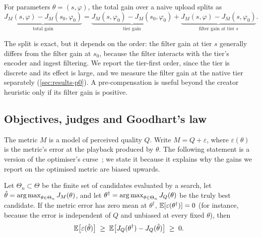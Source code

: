 \begin{definition}
\label{def:decomposition}
For parameters $\theta=(s,\varphi)$, the total gain over a naive upload splits as
\begin{equation}
  \underbrace{J_M(s,\varphi)-J_M(s_0,\varphi_0)}_{\text{total gain}}
  = \underbrace{J_M(s,\varphi_0)-J_M(s_0,\varphi_0)}_{\text{tier gain}}
  + \underbrace{J_M(s,\varphi)-J_M(s,\varphi_0)}_{\text{filter gain at tier } s}.
  \label{eq:decomposition}
\end{equation}
\end{definition}

The split is exact, but it depends on the order: the filter gain at tier $s$ generally differs from
the filter gain at $s_0$, because the filter interacts with the tier's encoder and ingest filtering.
We report the tier-first order, since the tier is discrete and its effect is large, and we measure
the filter gain at the native tier separately (\cref{sec:results-p0}). A pre-compensation is useful
beyond the creator heuristic only if its filter gain is positive.

\subsection{Objectives, judges and Goodhart's law}
\label{sec:goodhart}

The metric $M$ is a model of perceived quality $Q$. Write $M = Q + \varepsilon$, where
$\varepsilon(\theta)$ is the metric's error at the playback produced by $\theta$. The following
statement is a version of the optimiser's curse~\cite{smith2006optimizer}; we state it because it
explains why the gains we report on the optimised metric are biased upwards.

\begin{proposition}
\label{prop:curse}
Let $\Theta_n\subset\Theta$ be the finite set of candidates evaluated by a search, let
$\hat\theta=\operatorname*{arg\,max}_{\theta\in\Theta_n} J_M(\theta)$, and let
$\theta^\dagger=\operatorname*{arg\,max}_{\theta\in\Theta_n} J_Q(\theta)$ be the truly best candidate. If the metric
error has zero mean at $\theta^\dagger$, $\mathbb{E}[\varepsilon(\theta^\dagger)]=0$ (for instance, because
the error is independent of $Q$ and unbiased at every fixed $\theta$), then
\begin{equation}
  \mathbb{E}\big[\varepsilon(\hat\theta)\big] \;\ge\; \mathbb{E}\big[J_Q(\theta^\dagger)-J_Q(\hat\theta)\big] \;\ge\; 0 .
\end{equation}
\end{proposition}

